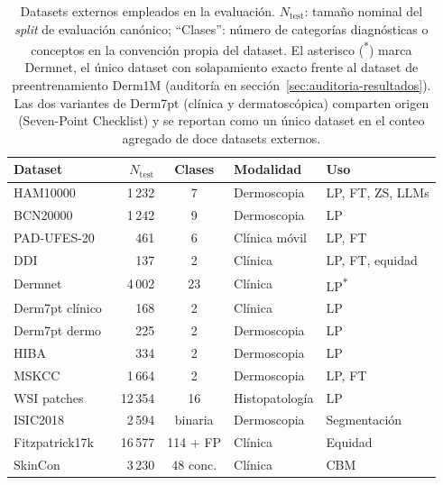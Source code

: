 \begin{table}[htbp]
\centering
\footnotesize
\setlength{\tabcolsep}{4pt}
\renewcommand{\arraystretch}{0.95}
\caption{Datasets externos empleados en la evaluación.
$N_{\mathrm{test}}$: tamaño nominal del \emph{split} de evaluación
canónico; ``Clases'': número de categorías diagnósticas o conceptos
en la convención propia del dataset. El asterisco
(\textsuperscript{$\ast$}) marca Dermnet, el único dataset con
solapamiento exacto frente al dataset de preentrenamiento Derm1M
(auditoría en sección~\ref{sec:auditoria-resultados}). Las dos variantes de Derm7pt
(clínica y dermatoscópica) comparten origen
(Seven-Point Checklist) y se reportan como un único dataset en el
conteo agregado de doce datasets externos.}
\label{tab:datasets-resumen}
\begin{tabular}{lrcll}
\hline
Dataset & $N_{\mathrm{test}}$ & Clases & Modalidad & Uso \\
\hline
HAM10000~\cite{ham10000}             & 1\,232  & 7        & Dermoscopia      & LP, FT, ZS, LLMs \\
BCN20000~\cite{bcn20000}             & 1\,242  & 9        & Dermoscopia      & LP \\
PAD-UFES-20~\cite{padufes}           & 461     & 6        & Clínica móvil    & LP, FT \\
DDI~\cite{ddi}                       & 137     & 2        & Clínica          & LP, FT, equidad \\
Dermnet~\cite{dermnet}               & 4\,002  & 23       & Clínica          & LP\textsuperscript{$\ast$} \\
Derm7pt clínico~\cite{kawahara2019}  & 168     & 2        & Clínica          & LP \\
Derm7pt dermo~\cite{kawahara2019}    & 225     & 2        & Dermoscopia      & LP \\
HIBA                                 & 334     & 2        & Dermoscopia      & LP \\
MSKCC                                & 1\,664  & 2        & Dermoscopia      & LP, FT \\
WSI patches                          & 12\,354 & 16       & Histopatología   & LP \\
ISIC2018~\cite{isic2018}             & 2\,594  & binaria  & Dermoscopia      & Segmentación \\
Fitzpatrick17k~\cite{fitzpatrick17k} & 16\,577 & 114 + FP & Clínica          & Equidad \\
SkinCon~\cite{skincon}               & 3\,230  & 48 conc. & Clínica          & CBM \\
\hline
\end{tabular}
\end{table}

